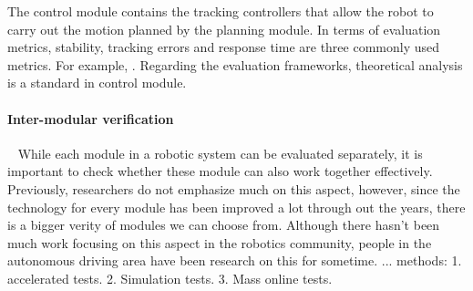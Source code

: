  The control module contains the tracking controllers that allow the robot to carry out the motion planned by the planning module. In terms of evaluation metrics, stability, tracking errors and response time are three commonly used metrics. For example, . Regarding the evaluation frameworks, theoretical analysis is a standard in control module. 

\begin{comment}
In \cite{kanjanawanishkul2009path, falcone2007predictive}, Model Predictive Control (MPC) is used for tracking purpose. As a result of a properly formulated MPC problem, the controllers are guaranteed to bring the tracking error to zero theoretically. Other commonly seen control methods that require empirical parameter-tuning are proposed \cite{kanayama1990stable, xian2004, niu2013barrier}. Stability of these control rules are proved through the use of a Liapunov function. Aside from theoretical guarantees, the performance of these control modules can also be evaluated by simply recording the tracking error.
\end{comment}


\paragraph{Inter-modular verification}~
While each module in a robotic system can be evaluated separately, it is important to check whether these module can also work together effectively. Previously, researchers do not emphasize much on this aspect, however, since the technology for every module has been improved a lot through out the years, there is a bigger verity of modules we can choose from. Although there hasn't been much work focusing on this aspect in the robotics community, people in the autonomous driving area have been research on this for sometime. ...    
methods: 1. accelerated tests. 2. Simulation tests. 3. Mass online tests.

